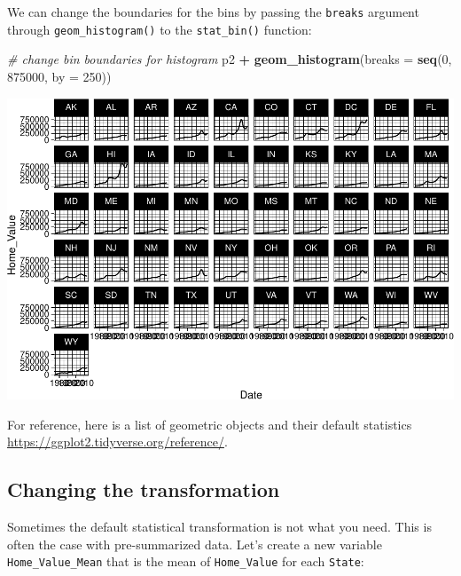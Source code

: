 \documentclass[
]{book}
\newenvironment{Shaded}{\begin{snugshade}}{\end{snugshade}}
\newcommand{\CommentTok}[1]{\textcolor[rgb]{0.56,0.35,0.01}{\textit{#1}}}
\newcommand{\DataTypeTok}[1]{\textcolor[rgb]{0.13,0.29,0.53}{#1}}
\newcommand{\DecValTok}[1]{\textcolor[rgb]{0.00,0.00,0.81}{#1}}
\newcommand{\KeywordTok}[1]{\textcolor[rgb]{0.13,0.29,0.53}{\textbf{#1}}}
\newcommand{\NormalTok}[1]{#1}
\newcommand{\OperatorTok}[1]{\textcolor[rgb]{0.81,0.36,0.00}{\textbf{#1}}}
\newcommand{\StringTok}[1]{\textcolor[rgb]{0.31,0.60,0.02}{#1}}
\begin{document}
We can change the boundaries for the bins by passing the \texttt{breaks} argument through \texttt{geom\_histogram()} to the \texttt{stat\_bin()} function:

\begin{Shaded}
\begin{Highlighting}[]
\CommentTok{\# change bin boundaries for histogram}
\NormalTok{p2 }\OperatorTok{+}\StringTok{ }\KeywordTok{geom\_histogram}\NormalTok{(}\DataTypeTok{breaks =} \KeywordTok{seq}\NormalTok{(}\DecValTok{0}\NormalTok{, }\DecValTok{875000}\NormalTok{, }\DataTypeTok{by =} \DecValTok{250}\NormalTok{))}
\end{Highlighting}
\end{Shaded}

\includegraphics{R/Rgraphics/figures/unnamed-chunk-182-1.pdf}

For reference, here is a list of geometric objects and their default statistics \url{https://ggplot2.tidyverse.org/reference/}.

\hypertarget{changing-the-transformation}{%
\subsection{Changing the transformation}\label{changing-the-transformation}}

Sometimes the default statistical transformation is not what you need. This is often the case with pre-summarized data. Let's create a new variable \texttt{Home\_Value\_Mean} that is the mean of \texttt{Home\_Value} for each \texttt{State}:
\end{document}
